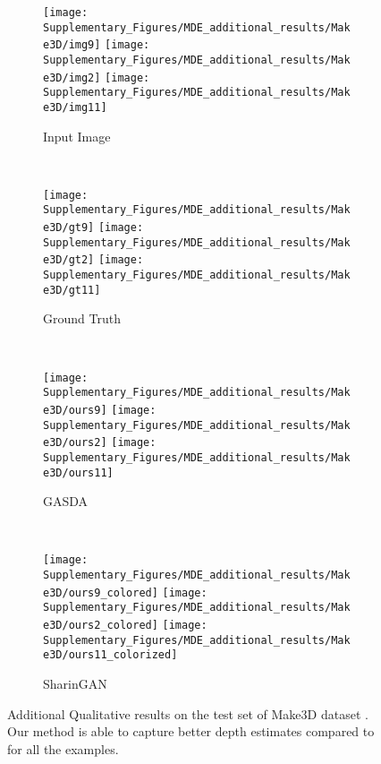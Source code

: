 \documentclass[10pt,twocolumn,letterpaper]{article}
\begin{document}
\begin{figure*}[h]
    \begin{subfigure}{0.25\linewidth}{
        \texttt{[image: Supplementary\_Figures/MDE\_additional\_results/Make3D/img9]}
        \texttt{[image: Supplementary\_Figures/MDE\_additional\_results/Make3D/img2]}
        \texttt{[image: Supplementary\_Figures/MDE\_additional\_results/Make3D/img11]}}
        \caption{Input Image}
    \end{subfigure}~
    \begin{subfigure}{0.25\linewidth}{
        \texttt{[image: Supplementary\_Figures/MDE\_additional\_results/Make3D/gt9]}
        \texttt{[image: Supplementary\_Figures/MDE\_additional\_results/Make3D/gt2]}
        \texttt{[image: Supplementary\_Figures/MDE\_additional\_results/Make3D/gt11]}}
        \caption{Ground Truth}
    \end{subfigure}~
    \begin{subfigure}{0.25\linewidth}{
        \texttt{[image: Supplementary\_Figures/MDE\_additional\_results/Make3D/ours9]}
        \texttt{[image: Supplementary\_Figures/MDE\_additional\_results/Make3D/ours2]}
        \texttt{[image: Supplementary\_Figures/MDE\_additional\_results/Make3D/ours11]}}
        \caption{GASDA\cite{GASDA}}
    \end{subfigure}~
    \begin{subfigure}{0.25\linewidth}{
        \texttt{[image: Supplementary\_Figures/MDE\_additional\_results/Make3D/ours9\_colored]}
        \texttt{[image: Supplementary\_Figures/MDE\_additional\_results/Make3D/ours2\_colored]}
        \texttt{[image: Supplementary\_Figures/MDE\_additional\_results/Make3D/ours11\_colorized]}}
        \caption{SharinGAN}
    \end{subfigure}\caption{Additional Qualitative results on the test set of Make3D dataset \cite{make3D}. Our method is able to capture better depth estimates compared to \cite{GASDA} for all the examples.}
\label{fig:MDE_SharinGAN_make3d_supplementary}
\end{figure*}
\end{document}
